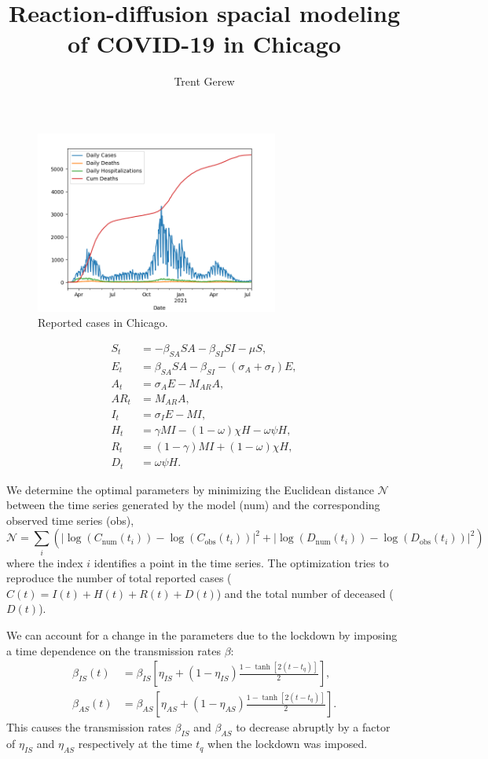 \documentclass[10pt,letterpaper,final]{article}
\author{Trent Gerew}
\title{Reaction-diffusion spacial modeling of COVID-19 in Chicago}
\newcommand{\N}{\mathcal{N}}
\newcommand{\num}{\text{num}}
\newcommand{\obs}{\text{obs}}
\begin{document}
	
	\maketitle
	
	\begin{figure}[h]
		\centering
		\includegraphics[width=8cm]{series_plot}
		\caption{Reported cases in Chicago.}
		\label{fig:series_plot}
	\end{figure}
	
	\begin{align}
		S_t &= - \beta_{SA} SA - \beta_{SI} SI - \mu S, \\
		E_t &= \beta_{SA} SA - \beta_{SI} - (\sigma_A + \sigma_I) E, \\
		A_t &= \sigma_A E - M_{AR} A, \\
		AR_t &= M_{AR} A, \\
		I_t &= \sigma_I E - MI, \\
		H_t &= \gamma M I - (1 - \omega) \chi H - \omega \psi H, \\
		R_t &= (1 - \gamma) M I + (1 - \omega) \chi H, \\
		D_t &= \omega \psi H.
	\end{align}
	
	We determine the optimal parameters by minimizing the Euclidean distance $\N$ between the time series generated by the model (num) and the corresponding observed time series (obs),
	\begin{equation}
		\N = \sum_i \left( \left| \log(C_{\num}(t_i)) - \log(C_{\obs}(t_i)) \right|^2
		+ \left| \log(D_{\num}(t_i)) - \log(D_{\obs}(t_i)) \right|^2 \right)
	\end{equation}
	where the index $i$ identifies a point in the time series.
	The optimization tries to reproduce the number of total reported cases ($C(t) = I(t) + H(t) + R(t) + D(t)$) and the total number of deceased ($D(t)$). \cite{Kevrekidis_2021}
	
	We can account for a change in the parameters due to the lockdown by imposing a time dependence on the transmission rates $\beta$:
	\begin{align}
		\beta_{IS} (t) &= \beta_{IS} \left[ \eta_{IS} + (1 - \eta_{IS}) \frac{1 - \tanh[2(t - t_q)]}{2} \right], \\
		\beta_{AS} (t) &= \beta_{AS} \left[ \eta_{AS} + (1 - \eta_{AS}) \frac{1 - \tanh[2(t - t_q)]}{2} \right].
	\end{align}
	This causes the transmission rates $\beta_{IS}$ and $\beta_{AS}$ to decrease abruptly by a factor of $\eta_{IS}$ and $\eta_{AS}$ respectively at the time $t_q$ when the lockdown was imposed. \cite{Wang_2020}
	
\end{document}

